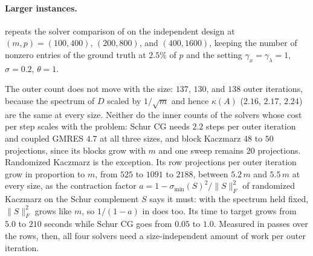 \documentclass[11pt]{article}
\begin{document}
\paragraph{Larger instances.}
 repeats the solver comparison of  on the independent design at $(m, p) = (100, 400)$, $(200, 800)$, and $(400, 1600)$, keeping the number of nonzero entries of the ground truth at $2.5\%$ of $p$ and the setting $\gamma_x = \gamma_\lambda = 1$, $\sigma = 0.2$, $\theta = 1$.
\begin{table}[htbp]
    \centering
    \caption{LASSO on the independent design at three sizes, at $\gamma_x = \gamma_\lambda = 1$, $\sigma = 0.2$, $\theta = 1$: outer and cumulative inner iterations to accuracy $10^{-7}$, the mean and largest inner count $N_k$, and wall-clock time.
    Block Kaczmarz uses blocks of $5\%$ of the rows, so one sweep is $20$ projections at every size.}
    \label{tab:lasso-sizes}
    
\end{table}
The outer count does not move with the size: $137$, $130$, and $138$ outer iterations, because the spectrum of $D$ scaled by $1/\sqrt{m}$ and hence $\kappa(A)$ ($2.16$, $2.17$, $2.24$) are the same at every size.
Neither do the inner counts of the solvers whose cost per step scales with the problem: Schur CG needs $2.2$ steps per outer iteration and coupled GMRES $4.7$ at all three sizes, and block Kaczmarz $48$ to $50$ projections, since its blocks grow with $m$ and one sweep remains $20$ projections.
Randomized Kaczmarz is the exception.
Its row projections per outer iteration grow in proportion to $m$, from $525$ to $1091$ to $2188$, between $5.2\,m$ and $5.5\,m$ at every size, as the contraction factor $a = 1 - \sigma_{\min}(S)^2/\|S\|_F^2$ of randomized Kaczmarz on the Schur complement $S$ says it must: with the spectrum held fixed, $\|S\|_F^2$ grows like $m$, so $1/(1 - a)$ in  does too.
Its time to target grows from $5.0$ to $210$ seconds while Schur CG goes from $0.05$ to $1.0$.
Measured in passes over the rows, then, all four solvers need a size-independent amount of work per outer iteration.
\end{document}
